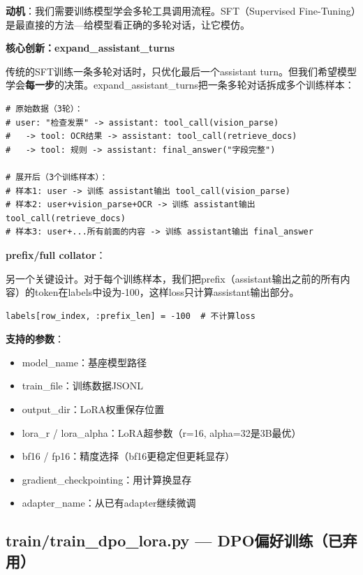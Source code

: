 \documentclass[fontset=none,11pt,a4paper]{ctexart}
\begin{document}
\textbf{动机}：我们需要训练模型学会多轮工具调用流程。SFT（Supervised Fine-Tuning）是最直接的方法---给模型看正确的多轮对话，让它模仿。

\textbf{核心创新：expand\_assistant\_turns}

传统的SFT训练一条多轮对话时，只优化最后一个assistant turn。但我们希望模型学会\textbf{每一步}的决策。expand\_assistant\_turns把一条多轮对话拆成多个训练样本：

\begin{lstlisting}
# 原始数据（3轮）：
# user: "检查发票" -> assistant: tool_call(vision_parse)
#   -> tool: OCR结果 -> assistant: tool_call(retrieve_docs)
#   -> tool: 规则 -> assistant: final_answer("字段完整")

# 展开后（3个训练样本）：
# 样本1: user -> 训练 assistant输出 tool_call(vision_parse)
# 样本2: user+vision_parse+OCR -> 训练 assistant输出 tool_call(retrieve_docs)
# 样本3: user+...所有前面的内容 -> 训练 assistant输出 final_answer
\end{lstlisting}

\textbf{prefix/full collator}：

另一个关键设计。对于每个训练样本，我们把prefix（assistant输出之前的所有内容）的token在labels中设为-100，这样loss只计算assistant输出部分。

\begin{lstlisting}
labels[row_index, :prefix_len] = -100  # 不计算loss
\end{lstlisting}

\textbf{支持的参数}：
\begin{itemize}[nosep]
    \item model\_name：基座模型路径
    \item train\_file：训练数据JSONL
    \item output\_dir：LoRA权重保存位置
    \item lora\_r / lora\_alpha：LoRA超参数（r=16, alpha=32是3B最优）
    \item bf16 / fp16：精度选择（bf16更稳定但更耗显存）
    \item gradient\_checkpointing：用计算换显存
    \item adapter\_name：从已有adapter继续微调
\end{itemize}

\subsection{train/train\_dpo\_lora.py --- DPO偏好训练（已弃用）}
\end{document}
